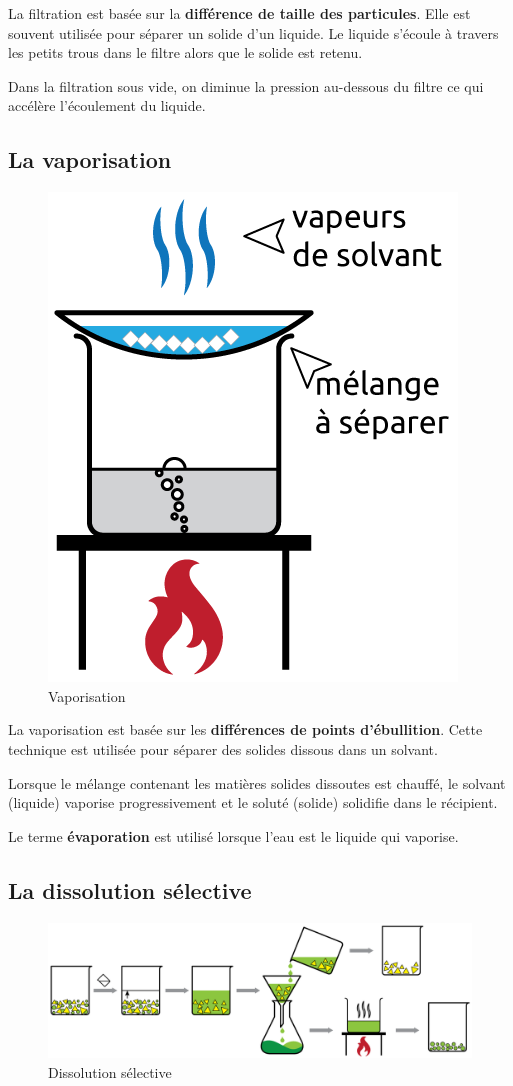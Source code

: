 \documentclass[
  11pt,
  french,
  a4paper,
  openany]{book}
\begin{document}
La filtration est basée sur la \textbf{différence de taille des particules}. Elle est souvent utilisée pour séparer un solide d'un liquide. Le liquide s'écoule à travers les petits trous dans le filtre alors que le solide est retenu.

Dans la filtration sous vide, on diminue la pression au-dessous du filtre ce qui accélère l'écoulement du liquide.

\newpage

\hypertarget{la-vaporisation}{%
\subsection{La vaporisation}\label{la-vaporisation}}

\begin{figure}

{\centering \includegraphics[width=0.25\linewidth]{images/evaporation} 

}

\caption{Vaporisation}\label{fig:evaporation}
\end{figure}

La vaporisation est basée sur les \textbf{différences de points d'ébullition}. Cette technique est utilisée pour séparer des solides dissous dans un solvant.

Lorsque le mélange contenant les matières solides dissoutes est chauffé, le solvant (liquide) vaporise progressivement et le soluté (solide) solidifie dans le récipient.

Le terme \textbf{évaporation} est utilisé lorsque l'eau est le liquide qui vaporise.

\hypertarget{la-dissolution-suxe9lective}{%
\subsection{La dissolution sélective}\label{la-dissolution-suxe9lective}}


\begin{figure}

{\centering \includegraphics[width=0.85\linewidth]{images/dissolution-selective} 

}

\caption{Dissolution sélective}\label{fig:dissolution-selective}
\end{figure}
\end{document}
